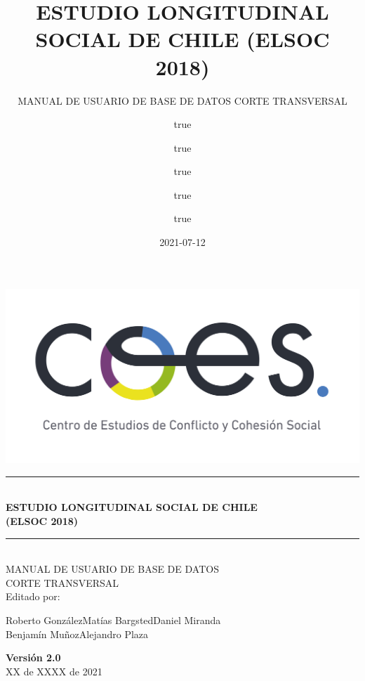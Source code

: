 \documentclass[
  openany]{book}
\title{ESTUDIO LONGITUDINAL SOCIAL DE CHILE (ELSOC 2018)}
\subtitle{MANUAL DE USUARIO DE BASE DE DATOS CORTE TRANSVERSAL}
\author{true \and true \and true \and true \and true}
\date{2021-07-12}
\newcommand{\HRule}[1]{\rule{\linewidth}{#1}}
\begin{document}
\maketitle

\begin{titlepage}
	\centering
	\includegraphics[width=16cm]{coes_blanco_esp.jpg}

\HRule{1.4pt} \\
\LARGE \textbf{\uppercase{Estudio Longitudinal Social de Chile}}\\
\LARGE \textbf{\uppercase{(ELSOC 2018)}}\\

\HRule{1.4pt} \\ [0.2cm]

\normalsize  \vspace*{0.2\baselineskip}
 \large \textsc{MANUAL DE USUARIO DE BASE DE DATOS\\ 	CORTE TRANSVERSAL}
\\ [0.2cm]
\vspace*{0.9cm}
Editado por:\\
\begin{center}
Roberto González\hspace*{1.25cm}Matías Bargsted\hspace*{1.25cm}Daniel Miranda\\
Benjamín Muñoz\hspace*{1.5cm}Alejandro Plaza\\
\end{center}
\vspace*{1.3cm}
\textbf{Versión 2.0}\\
XX de XXXX de  2021\\
\end{titlepage}

\newpage

\thispagestyle{empty}
\begin{minipage}[b]{1\linewidth}
    \tableofcontents
\end{minipage}
\end{document}
